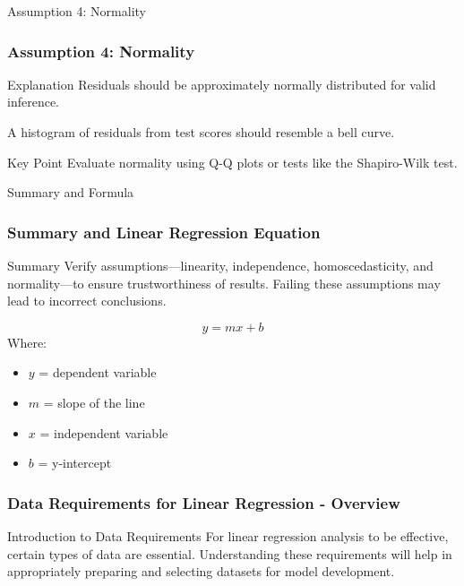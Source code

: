 \documentclass[aspectratio=169]{beamer}
\begin{document}
\begin{frame}[fragile]{Assumption 4: Normality}
    \frametitle{Assumption 4: Normality}
    \begin{block}{Explanation}
        Residuals should be approximately normally distributed for valid inference.
    \end{block}
    \begin{example}
        A histogram of residuals from test scores should resemble a bell curve.
    \end{example}
    \begin{block}{Key Point}
        Evaluate normality using Q-Q plots or tests like the Shapiro-Wilk test.
    \end{block}
\end{frame}

\begin{frame}[fragile]{Summary and Formula}
    \frametitle{Summary and Linear Regression Equation}
    \begin{block}{Summary}
        Verify assumptions—linearity, independence, homoscedasticity, and normality—to ensure trustworthiness of results.
        Failing these assumptions may lead to incorrect conclusions.
    \end{block}
    \begin{equation}
        y = mx + b
    \end{equation}
    Where:
    \begin{itemize}
        \item $y$ = dependent variable
        \item $m$ = slope of the line
        \item $x$ = independent variable
        \item $b$ = y-intercept
    \end{itemize}
\end{frame}

\begin{frame}[fragile]
    \frametitle{Data Requirements for Linear Regression - Overview}
    \begin{block}{Introduction to Data Requirements}
        For linear regression analysis to be effective, certain types of data are essential. 
        Understanding these requirements will help in appropriately preparing and selecting datasets for model development.
    \end{block}
\end{frame}
\end{document}
